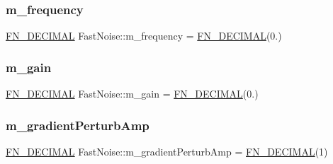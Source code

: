 \mbox{\label{class_fast_noise_a56081fefba1dff55a03aa87e261e225a}} 
\subsubsection{\texorpdfstring{m\+\_\+frequency}{m\_frequency}}
{\footnotesize\ttfamily \mbox{\hyperlink{_fast_noise_8h_a75a9ef6d2541c4921815b885bfd449c3}{F\+N\+\_\+\+D\+E\+C\+I\+M\+AL}} Fast\+Noise\+::m\+\_\+frequency = \mbox{\hyperlink{_fast_noise_8h_a75a9ef6d2541c4921815b885bfd449c3}{F\+N\+\_\+\+D\+E\+C\+I\+M\+AL}}(0.)\hspace{0.3cm}{\ttfamily [private]}}

\mbox{\label{class_fast_noise_a60a3f1e6d9b69c8287e4b828148f4072}} 
\subsubsection{\texorpdfstring{m\+\_\+gain}{m\_gain}}
{\footnotesize\ttfamily \mbox{\hyperlink{_fast_noise_8h_a75a9ef6d2541c4921815b885bfd449c3}{F\+N\+\_\+\+D\+E\+C\+I\+M\+AL}} Fast\+Noise\+::m\+\_\+gain = \mbox{\hyperlink{_fast_noise_8h_a75a9ef6d2541c4921815b885bfd449c3}{F\+N\+\_\+\+D\+E\+C\+I\+M\+AL}}(0.)\hspace{0.3cm}{\ttfamily [private]}}

\mbox{\label{class_fast_noise_adfc33805dc8b3bbb1639b742e32f693d}} 
\subsubsection{\texorpdfstring{m\+\_\+gradient\+Perturb\+Amp}{m\_gradientPerturbAmp}}
{\footnotesize\ttfamily \mbox{\hyperlink{_fast_noise_8h_a75a9ef6d2541c4921815b885bfd449c3}{F\+N\+\_\+\+D\+E\+C\+I\+M\+AL}} Fast\+Noise\+::m\+\_\+gradient\+Perturb\+Amp = \mbox{\hyperlink{_fast_noise_8h_a75a9ef6d2541c4921815b885bfd449c3}{F\+N\+\_\+\+D\+E\+C\+I\+M\+AL}}(1)\hspace{0.3cm}{\ttfamily [private]}}


